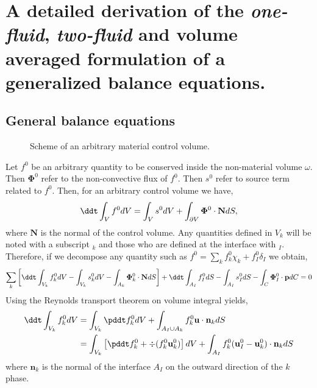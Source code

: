 \chapter{A detailed derivation of the \textit{one-fluid}, \textit{two-fluid} and volume averaged formulation of a generalized balance equations.}
\label{ap:average}

\section{General balance equations}

\begin{figure}[h]
    \centering
    \caption{Scheme of an arbitrary material control volume.   }
\end{figure}

Let $f^0$  be an arbitrary quantity to be conserved inside the non-material volume $\omega$. 
Then $\bm\Phi^0$ refer to the non-convective flux of $f^0$. 
Then $s^0$ refer to source term  related to  $f^0$. 
Then, for an arbitrary control volume we have, 
\begin{equation*}
    \ddt \int_{V} f^0 dV 
    = 
    \int_{V} s^0 dV 
    + \int_{\partial V} \mathbf{\Phi}^0 \cdot \textbf{N} dS,
\end{equation*}
where $\textbf{N}$ is the normal of the control volume. 
Any quantities defined in $V_k$ will be noted with a subscript $_k$ and those who are defined at the interface with $_I$. 
Therefore, if we decompose any quantity such as $f^0 = \sum_k f_k^0 \chi_k + f_I^0 \delta_I$ we obtain, 
\begin{multline*}
    \sum_k\left[\ddt \int_{V_k} f_k^0 dV 
    - \int_{V_k} s_k^0 dV 
    - \int_{A_k} \mathbf{\Phi}_k^0 \cdot \textbf{N} dS
    \right]
    + \ddt \int_{A_I} f_I^0 dS 
    - \int_{A_I} s_I^0 dS 
    - \int_{C} \mathbf{\Phi}_I^0 \cdot \textbf{p} dC 
    = 0
\end{multline*}
Using the Reynolds transport theorem on volume integral yields,
\begin{align*}
    \ddt \int_{V_k} f_k^0 dV 
    &= \int_{V_k} \pddt f_k^0 dV 
    + \int_{A_I \cup A_k} f_k^0 \textbf{u} \cdot \textbf{n}_k dS\\
    &= \int_{V_k} \left[
        \pddt f_k^0  + \div (f_k^0 \textbf{u}_k^0) 
    \right]dV 
    + \int_{A_I} f_k^0 (\textbf{u}_I^0 - \textbf{u}_k^0) \cdot \textbf{n}_k dS\\
\end{align*}
where $\textbf{n}_k$ is the normal of the interface $A_I$ on the outward direction of the $k$ phase. 

